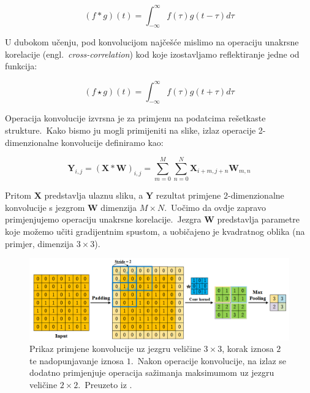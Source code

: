 \documentclass[diplomskirad]{fer}
\begin{document}
\begin{equation}
  (f * g)(t) = \int_{-\infty}^{\infty} f(\tau) g(t - \tau) d\tau
  \label{eq:conv_original}
\end{equation}

\pagebreak

U dubokom učenju, pod konvolucijom najčešće mislimo na operaciju unakrsne korelacije (engl.\ \textit{cross-correlation}) kod koje izostavljamo reflektiranje jedne od funkcija:

\begin{equation}
  (f \star g)(t) = \int_{-\infty}^{\infty} f(\tau) g(t + \tau) d\tau
  \label{eq:cross_corel}
\end{equation}

Operacija konvolucije izvrsna je za primjenu na podatcima rešetkaste strukture.\ Kako bismo ju mogli primijeniti na slike, izlaz operacije 2-dimenzionalne konvolucije definiramo kao:

\begin{equation}
  \bm{Y}_{i,j} = (\bm{X} * \bm{W})_{i,j} = \sum_{m=0}^{M} \sum_{n=0}^{N} \bm{X}_{i+m,j+n} \bm{W}_{m,n}
  \label{eq:conv_2d}
\end{equation}

Pritom $\bm{X}$ predstavlja ulaznu sliku, a $\bm{Y}$ rezultat primjene 2-dimenzionalne konvolucije s jezgrom $\bm{W}$ dimenzija $M \times N$.\ Uočimo da ovdje zapravo primjenjujemo operaciju unakrsne korelacije.\
Jezgra $\bm{W}$ predstavlja parametre koje možemo učiti gradijentnim spustom, a uobičajeno je kvadratnog oblika (na primjer, dimenzija $3 \times 3$).\ 

\begin{figure}[h]
  \centering
  \includegraphics[scale=0.75]{./Slike/conv.png}
  \caption{Prikaz primjene konvolucije uz jezgru veličine $3 \times 3$, korak iznosa $2$ te nadopunjavanje iznosa $1$.\ Nakon operacije konvolucije, na izlaz se dodatno primjenjuje operacija sažimanja maksimumom uz jezgru veličine $2 \times 2$.\ Preuzeto iz \cite{li2021survey}.}
  \label{fig:conv}
\end{figure}
\end{document}

